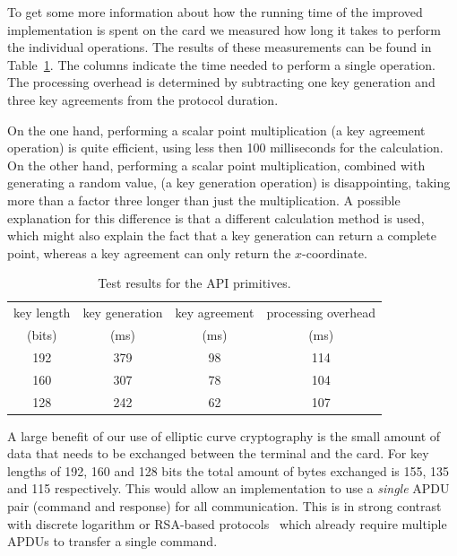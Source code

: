 To get some more information about how the running time of the improved
implementation is spent on the card we measured how long it takes to perform the
individual operations. The results of these measurements can be found in
Table~\ref{tab:primitives}. The columns indicate the time needed to perform a
single operation. The processing overhead is determined by subtracting one key
generation and three key agreements from the protocol duration.

On the one hand, performing a scalar point multiplication (a key agreement operation) is quite efficient, using less then
100 milliseconds for the calculation. On the other hand, performing a scalar 
point multiplication, combined with generating a random value, (a key generation
operation) is disappointing, taking more than a factor three longer than just 
the multiplication. A possible explanation for this difference is that a 
different calculation method is used, which might also explain the fact that a 
key generation can return a complete point, whereas a key agreement can only 
return the $x$-coordinate.

\begin{table}[H]
  \centering
  \caption{Test results for the API primitives.}
  \label{tab:primitives}
  \renewcommand{\tabcolsep}{1.25mm}
  \renewcommand{\arraystretch}{1.25}
  \begin{tabular}{| c || c | c | c |}\hline
    key length & key generation & key agreement & processing overhead \\
    (bits) & (ms) & (ms) & (ms) \\\hline
    \hline
    192 & 379 & 98 & 114 \\\hline
    160 & 307 & 78 & 104 \\\hline
    128 & 242 & 62 & 107 \\\hline
  \end{tabular}
\end{table}

A large benefit of our use of elliptic curve cryptography is the small amount of data that needs to be
exchanged between the terminal and the card. For key lengths of 192, 160 and 128
bits the total amount of bytes exchanged is 155, 135 and 115 respectively. This
would allow an implementation to use a \emph{single} APDU pair (command and
response) for all communication. This is in strong contrast with discrete
logarithm or RSA-based protocols~\cite{Sterckx09,TewsJacobs09} which already
require multiple APDUs to transfer a single command.


